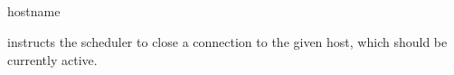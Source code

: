 \subsection{\BtdisconnName}

\begin{expara}

\BtdisconnName{} hostname

\end{expara}

\PrBtdisconn{} instructs the \ProductName{} scheduler to close a connection to the given host, which should be currently active.

